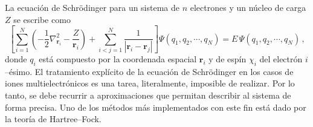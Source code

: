La ecuación de Schrödinger para un sistema de $n$ electrones y 
un núcleo de carga $Z$ se escribe como
\begin{equation}
\left[
\sum_{i=1}^N \left(-\frac{1}{2}\nabla^2_{{\mathbf r}_i}
                   -\frac{Z}{{\mathbf r}_i}\right) + 
\sum_{i<j=1}^N \frac{1}{|{\mathbf r}_i - {\mathbf r}_j |} 
\right] \Psi\left(q_1,q_2,\cdots,q_N\right) 
= E\, \Psi\left(q_1,q_2,\cdots,q_N\right) 
\, ,
\label{eq:Schro}
\end{equation}
donde $q_i$ está compuesto por la coordenada espacial $\mathbf{r}_i$ y 
de espín $\chi_i$ del electrón $i$--ésimo. El tratamiento explícito de 
la ecuación de Schr\"odinger en los casos de iones multielectrónicos es 
una tarea, literalmente, imposible de realizar. Por lo tanto, se debe 
recurrir a aproximaciones que permitan describir al sistema de forma 
precisa. Uno de los métodos más implementados con este fin está dado por 
la teoría de Hartree--Fock. 

